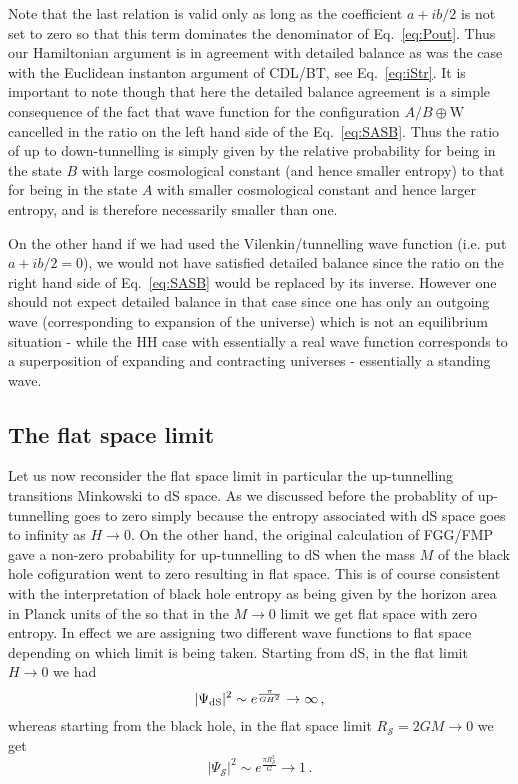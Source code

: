 \documentclass[11pt,a4paper]{article}
\begin{document}
Note that the last relation is valid only as long as the coefficient
$a+ib/2$ is not set to zero so that this term dominates the denominator of Eq.~\eqref{eq:Pout}. Thus our Hamiltonian argument is in agreement with detailed balance as was the case with the Euclidean
instanton argument of CDL/BT, see Eq.~\eqref{eq:iStr}. It is important
to note though that here the detailed balance agreement is a simple
consequence of the fact that wave function for the configuration $A/B \oplus \text{W}$ cancelled in the ratio on the left hand side of the Eq.~\eqref{eq:SASB}. Thus the ratio of up to down-tunnelling is simply given by the relative probability for being in the state $B$  with large cosmological constant (and hence smaller entropy) to that for being in the state $A$ with smaller cosmological constant and hence larger entropy, and is therefore necessarily smaller than one.

On the other hand if we had used the Vilenkin/tunnelling wave function (i.e. put $a+ib/2=0$), we would not have satisfied detailed balance since the ratio on the right hand side of Eq.~\eqref{eq:SASB} would be replaced by its inverse. However one should not expect detailed balance in that case since one has only an outgoing wave (corresponding to expansion of the universe) which is not an equilibrium situation - while the HH case with essentially a real wave function corresponds to a superposition of expanding and contracting universes - essentially a standing wave.

\subsection{The flat space limit}

Let us now reconsider the flat space limit in particular the up-tunnelling transitions Minkowski to dS space. As we discussed before the probablity of up-tunnelling goes to zero simply because the entropy associated with dS space goes to infinity as $H \rightarrow 0$. On the other hand, the original calculation of FGG/FMP gave a non-zero probability for up-tunnelling to dS when the mass $M$ of the black hole cofiguration went to zero resulting in flat space. This is of course consistent with the interpretation of black hole entropy as being given by the horizon area in Planck units of the so that in the $M\rightarrow 0$ limit we get flat space with zero entropy. In effect we are assigning
two different wave functions to flat space depending on which limit
is being taken. Starting from dS, in the flat limit $H\rightarrow 0$ we had
\begin{equation}
| \Psi_{\rm dS}|^{2}\sim e^{\frac{\pi}{G H^2}} \rightarrow \infty \,,
\end{equation}
whereas starting from the black hole, in the flat space limit $R_{\mathcal{S}} = 2GM \rightarrow 0$ we get 
\begin{equation}
| \Psi_{{\mathcal{S}}}|^{2} \sim e^{\frac{\pi R_{\mathcal{S}}^{2}}{G}} \rightarrow 1 \,.
\end{equation}
\end{document}
